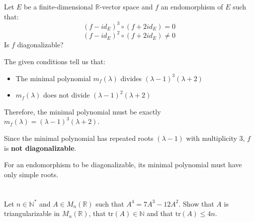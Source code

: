 \documentclass[12pt]{article}
\begin{document}
\section{}
Let $E$ be a finite-dimensional $\mathbb{R}$-vector space and $f$ an endomorphism of $E$ such that:
$$(f-id_{E})^{3}\circ(f+2id_{E})=0$$
$$(f-id_{E})^{2}\circ(f+2id_{E})\ne0$$
Is $f$ diagonalizable?

\begin{correctionbox}
The given conditions tell us that:
\begin{itemize}
    \item The minimal polynomial $m_f(\lambda)$ divides $(\lambda-1)^3(\lambda+2)$
    \item $m_f(\lambda)$ does not divide $(\lambda-1)^2(\lambda+2)$
\end{itemize}

Therefore, the minimal polynomial must be exactly $m_f(\lambda) = (\lambda-1)^3(\lambda+2)$.

Since the minimal polynomial has repeated roots $(\lambda-1)$ with multiplicity 3, $f$ is \textbf{not diagonalizable}.

For an endomorphism to be diagonalizable, its minimal polynomial must have only simple roots.
\end{correctionbox}

\section{}
Let $n \in \mathbb{N}^{*}$ and $A \in M_{n}(\mathbb{R})$ such that $A^{4}=7A^{3}-12A^{2}$. Show that $A$ is triangularizable in $M_{n}(\mathbb{R})$, that $\text{tr}(A) \in \mathbb{N}$ and that $\text{tr}(A) \le 4n$.
\end{document}
